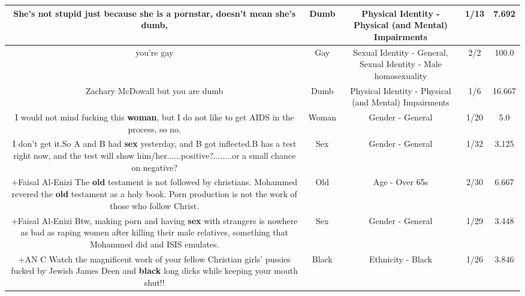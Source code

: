 \documentclass[11pt]{article}
\newlength\mylength
\begin{document}
\begin{center}
\begin{longtable}{|C{.65\mylength}|C{.30\mylength}|C{.12\mylength}|C{.12\mylength}|C{.12\mylength}|}
  \small She's not stupid just because she is a pornstar, doesn't mean she's \textbf{dumb},\normalsize   & Dumb & Physical Identity - Physical (and Mental) Impairments & 1/13 & 7.692 \\  \hline
  \small you're gay\normalsize   & Gay & Sexual Identity - General, Sexual Identity - Male homosexuality & 2/2 & 100.0 \\  \hline
  \small Zachary McDowall but you are dumb\normalsize   & Dumb & Physical Identity - Physical (and Mental) Impairments & 1/6 & 16.667 \\  \hline
  \small I would not mind fucking this \textbf{woman}, but I do not like to get AIDS in the process, so no.\normalsize   & Woman & Gender - General & 1/20 & 5.0 \\  \hline
  \small I don't get it.So A and B had \textbf{sex} yesterday, and B got inflected.B has a test right now, and the test will show him/her......positive?........or a small chance on negative?\normalsize   & Sex & Gender - General & 1/32 & 3.125 \\  \hline
  \small +Faisal Al-Enizi The \textbf{old} testament is not followed by christians. Mohammed revered the \textbf{old} testament as a holy book. Porn production is not the work of those who follow Christ.\normalsize   & Old & Age - Over 65s & 2/30 & 6.667 \\  \hline
  \small +Faisal Al-Enizi Btw, making porn and having \textbf{sex} with strangers is nowhere as bad as raping women after killing their male relatives, something that Mohammed did and ISIS emulates.\normalsize   & Sex & Gender - General & 1/29 & 3.448 \\  \hline
  \small +AN C Watch the magnificent work of your fellow Christian girls' pussies fucked by Jewish James Deen and \textbf{black} long dicks while keeping your mouth shut!!\normalsize   & Black & Ethnicity - Black & 1/26 & 3.846 \\  \hline

\end{longtable}
\end{center}
\end{document}

